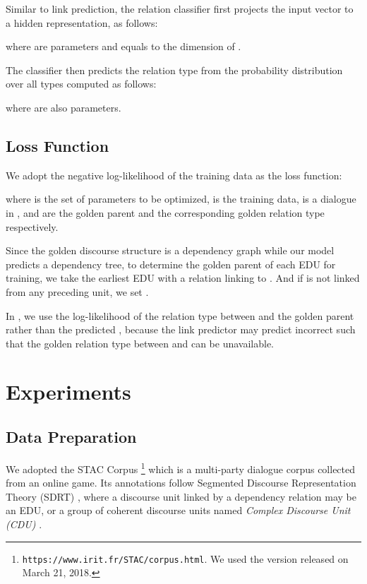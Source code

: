 \documentclass[letterpaper]{article} \usepackage{aaai19}  \usepackage{times}  \usepackage{helvet}  \usepackage{courier}  \usepackage{url}  \usepackage{graphicx}  \usepackage{amssymb}
\begin{document}
Similar to link prediction, the relation classifier first projects the input vector  to a hidden representation, as follows:
  
where  are parameters and  equals to the  dimension of .

The classifier then predicts the relation type  from the probability distribution over all types computed as follows:
 
where  are also parameters.

\subsection{Loss Function}

We adopt the negative log-likelihood of the training data as the loss function:
 


where  is the set of parameters to be optimized,  is the training data,  is a dialogue in ,  and  are the golden parent and the corresponding golden relation type respectively.

Since the golden discourse structure is a dependency graph while our model predicts a dependency tree, to determine the golden parent  of each EDU  for training, we take the earliest EDU with a relation linking to . And if  is not linked from any preceding unit, we set .

In , we use the log-likelihood of the relation type between  and the golden parent  rather than the predicted , because the link predictor may predict incorrect  such that the golden relation type between  and  can be unavailable.

\section{Experiments}

\subsection{Data Preparation}

We adopted the STAC Corpus \cite{STACcorpus}\footnote{\texttt{https://www.irit.fr/STAC/corpus.html}. We used the version released on March 21, 2018.} which is a multi-party dialogue corpus collected from an online game.
Its annotations follow Segmented Discourse Representation Theory (SDRT) \cite{asher2003logics}, where a discourse unit linked by a dependency relation may be an EDU, or a group of coherent discourse units named \emph{Complex Discourse Unit (CDU)} \cite{STACcorpus}.
\end{document}
